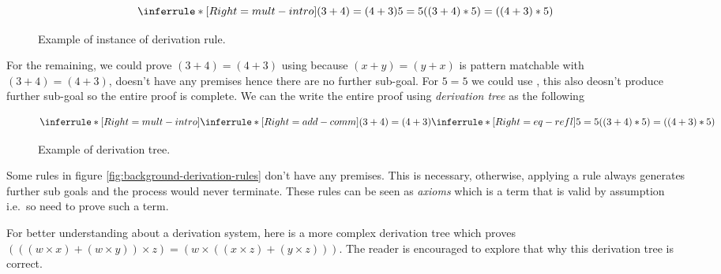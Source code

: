 \documentclass[master.tex]{subfiles}
\begin{document}
\begin{figure}[H]
\centering
$$ \derivTree{mult-intro}{((3 + 4) * 5) = ((4 + 3) * 5)}{(3 + 4) = (4 + 3) \\ 5 = 5} $$
\caption{Example of instance of derivation rule.}
\end{figure}

For the remaining, we could prove $(3 + 4) = (4 + 3)$ using
 because $(x + y) = (y + x)$ is pattern matchable with $(3
+ 4) = (4 + 3)$,  doesn't have any premises hence there are
no further sub-goal. For $5 = 5$ we could use , this also
deosn't produce further sub-goal so the entire proof is complete. We can the
write the entire proof using \emph{derivation tree} as the following

\begin{figure}[H]
\centering
$$ \derivTree{mult-intro}{((3 + 4) * 5) = ((4 + 3) * 5)}
     {\derivTree{add-comm}{(3 + 4) = (4 + 3)}{ } \\ \\ \\
      \derivTree{eq-refl}{5 = 5}{ }} $$
\caption{Example of derivation tree.}
\label{fig:background-derivation-tree-1}
\end{figure}

Some rules in figure \ref{fig:background-derivation-rules} don't have any
premises. This is necessary, otherwise, applying a rule always generates further
sub goals and the process would never terminate. These rules can be seen as
\emph{axioms} which is a term that is valid by assumption i.e.\ so need to prove
such a term.

For better understanding about a derivation system, here is a more complex
derivation tree which proves $(((w \times x) + (w \times y)) \times z) = (w
\times ((x \times z) + (y \times z)))$. The reader is encouraged to explore that
why this derivation tree is correct.

\vspace{-1em}
\end{document}

